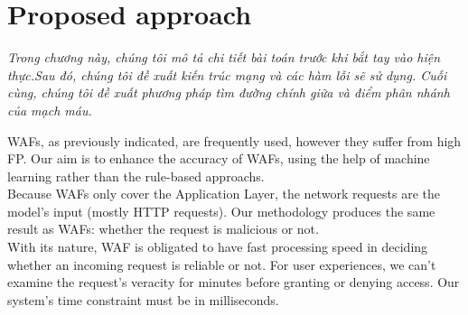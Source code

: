 \chapter{Proposed approach}
\label{chap:phuong_an_de_xuat}
	\textit{Trong chương này, chúng tôi mô tả chi tiết bài toán trước khi bắt tay vào hiện thực.\linebreak Sau đó, chúng tôi đề xuất kiến trúc mạng và các hàm lỗi sẽ sử dụng. Cuối cùng, chúng tôi đề xuất phương pháp tìm đường chính giữa và điểm phân nhánh của mạch máu.}
\minitoc

WAFs, as previously indicated, are frequently used, however they suffer from high FP. Our aim is to enhance the accuracy of WAFs, using the help of machine learning rather than the rule-based approachs.  \\
Because WAFs only cover the Application Layer, the network requests are the model's input (mostly HTTP requests). Our methodology produces the same result as WAFs: whether the request is malicious or not.\\
With its nature, WAF is obligated to have fast processing speed in deciding whether an incoming request is reliable or not. For user experiences, we can't examine the request's veracity for minutes before granting or denying access. Our system's time constraint must be in milliseconds.\\
